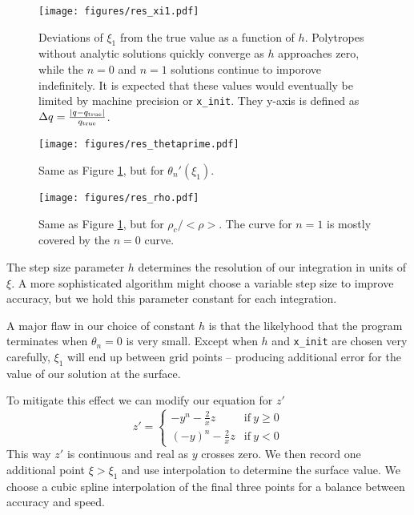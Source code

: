 \documentclass[twocolumn]{aastex631}
\begin{document}
\begin{figure}
    \begin{centering}
        \texttt{[image: figures/res\_xi1.pdf]}
        \caption{Deviations of $\xi_1$ from the true value as a
        function of $h$. Polytropes without analytic solutions
        quickly converge as $h$ approaches zero, while the
        $n=0$ and $n=1$ solutions continue to imporove indefinitely.
        It is expected that these values would eventually
        be limited by machine precision or \texttt{x\_init}.
        They y-axis is defined as
        $\Delta q = \frac{|q-q_{\rm true}|}{q_{\rm true}}$.
        }
        \label{fig:res_xi1}
    \end{centering}
\end{figure}

\begin{figure}
    \begin{centering}
        \texttt{[image: figures/res\_thetaprime.pdf]}
        \caption{Same as Figure \ref{fig:res_xi1}, but for
        $\theta_n'(\xi_1)$.}
        \label{fig:res_thetaprime}
    \end{centering}
\end{figure}

\begin{figure}
    \begin{centering}
        \texttt{[image: figures/res\_rho.pdf]}
        \caption{Same as Figure \ref{fig:res_xi1}, but for
        $\rho_c/<\rho>$. The curve for $n=1$ is mostly covered
        by the $n=0$ curve.}
        \label{fig:res_rho}
    \end{centering}
\end{figure}

The step size parameter $h$ determines the resolution of our integration
in units of $\xi$. A more sophisticated algorithm might choose a variable
step size to improve accuracy, but we hold this parameter constant
for each integration.

A major flaw in our choice of constant $h$ is that the likelyhood that
the program terminates when $\theta_n=0$ is very small. Except when $h$
and \texttt{x\_init} are chosen very carefully, $\xi_1$ will end up
between grid points -- producing additional error for the value
of our solution at the surface.

To mitigate this effect we can modify our equation for $z'$
\[
    z' =
    \begin{cases}
        -y^n - \frac{2}{x}z & \text{if}~y\ge0 \\
        (-y)^n - \frac{2}{x}z & \text{if}~y<0
    \end{cases}
\]
This way $z'$ is continuous and real as $y$ crosses zero. We then
record one additional point $\xi>\xi_1$ and use interpolation
to determine the surface value. We choose a cubic spline interpolation
of the final three points for a balance between accuracy and
speed.
\end{document}
